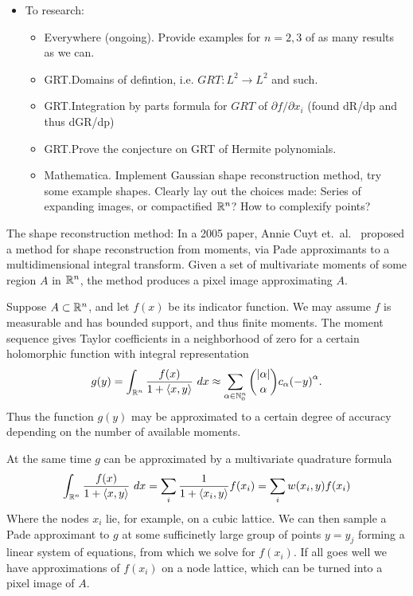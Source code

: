 \begin{itemize}
\item To research:
\begin{itemize}
\item Everywhere (ongoing). Provide examples for $n = 2, 3$ of as many results as we can.
\item GRT.\@ Domains of defintion, i.e. $GRT: L^2 \rightarrow L^2$ and such.
\item GRT.\@ Integration by parts formula for $GRT$ of $\partial f/\partial x_i$ (found dR/dp and thus dGR/dp)
\item GRT.\@ Prove the conjecture on GRT of Hermite polynomials.
\item Mathematica. Implement Gaussian shape reconstruction method, try some example shapes. Clearly lay out the choices made: Series of expanding images, or compactified $\mathbb{R}^n$? How to complexify points?
\end{itemize}
\end{itemize}

The shape reconstruction method: In a 2005 paper, Annie Cuyt et.\ al.\ \cite{Cuyt05} proposed a method for shape reconstruction from moments, via Pade approximants to a multidimensional integral transform. Given a set of multivariate moments of some region $A$ in $\mathbb{R}^n$, the method produces a pixel image approximating $A$. 

Suppose $A \subset \mathbb{R}^n$, and let $f(x)$ be its indicator function. We may assume $f$ is measurable and has bounded support, and thus finite moments. The moment sequence gives Taylor coefficients in a neighborhood of zero for a certain holomorphic function with integral representation
\begin{align*}
    g(y) = \int_{\mathbb{R}^n} \frac{f(x)}{1 + \langle x, y\rangle} ~dx \approx \sum_{\alpha \in \mathbb{N}_0^n} \binom{|\alpha|}{\alpha} c_\alpha {(-y)}^\alpha.
\end{align*}
Thus the function $g(y)$ may be approximated to a certain degree of accuracy depending on the number of available moments.

At the same time $g$ can be approximated by a multivariate quadrature formula
\[
    \int_{\mathbb{R}^n} \frac{f(x)}{1 + \langle x, y\rangle} ~dx
    = \sum_{i} \frac1{1+\langle x_i, y\rangle} f(x_i)
    = \sum_{i} w(x_i, y) f(x_i)
\]
Where the nodes $x_i$ lie, for example, on a cubic lattice. We can then sample a Pade approximant to $g$ at some sufficinetly large group of points $y = y_j$ forming a linear system of equations, from which we solve for $f(x_i)$. If all goes well we have approximations of $f(x_i)$ on a node lattice, which can be turned into a pixel image of $A$.

